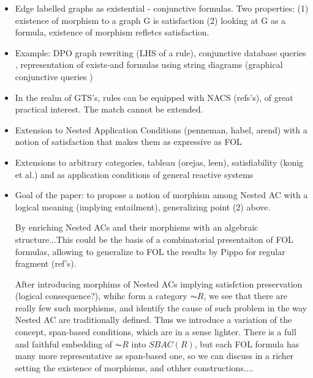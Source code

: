 \begin{itemize}
    \item Edge labelled graphs  as existential - conjunctive formulas. Two properties: (1) existence of morphism to a graph G is satisfaction (2) looking at G as a formula, existence of morphism refletcs satisfaction.
    \item Example: DPO graph rewriting (LHS of a rule), conjunctive database queries \cite{DBLP:conf/stoc/ChandraM77}, representation of exists-and formulas using string diagrams (graphical conjunctive queries \cite{DBLP:conf/csl/BonchiSS18})
    \item In the realm of GTS's, rules can be equipped with NACS (refs's), of great practical interest. The match cannot be extended. 
    \item Extension to Nested Application Conditions (penneman, habel, arend) with a notion of satisfaction that makes them as expressive as FOL
    \item Extensions to arbitrary categories, tableau (orejas, leen), satisfiability (konig et al.) and as application conditions of general reactive systems
    \item  Goal of the paper: to propose a notion of morphism among Nested AC with a logical meaning (implying entailment), generalizing point (2) above. 
    
    By enriching Nested ACs and their morphisms with an algebraic structure...This could be the basis of a combinatorial presentaiton of FOL formulas, allowing to generalize to FOL the results by Pippo for regular fragment (ref's).
    
    After introducing morphims of Nested ACs implying satisfction preservation (logical consequence?), whihc form a category $\AC{R}$, we see that there are really few such morphisms, and identify the cause of such problem in the way Nested AC are traditionally defined. Thus we introduce a variation of the concept, span-based conditions, which are in a sense lighter. There is a full and faithful embedding of $\AC{R}$ into $SBAC(R)$, but each FOL formula has many more representative as span-based one, so we can discuss in a richer setting the existence of morphisms, and othher constructions....

\end{itemize}
    